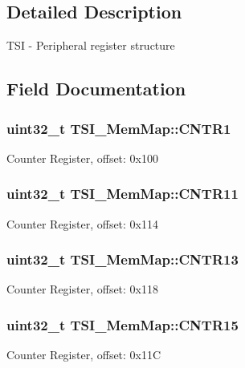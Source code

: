 \subsection{Detailed Description}
T\+S\+I -\/ Peripheral register structure 

\subsection{Field Documentation}
\hypertarget{struct_t_s_i___mem_map_a04fc03ca20b588fb20be9eee512fbfeb}{}
\subsubsection[{C\+N\+T\+R1}]{\setlength{\rightskip}{0pt plus 5cm}uint32\+\_\+t T\+S\+I\+\_\+\+Mem\+Map\+::\+C\+N\+T\+R1}\label{struct_t_s_i___mem_map_a04fc03ca20b588fb20be9eee512fbfeb}
Counter Register, offset\+: 0x100 \hypertarget{struct_t_s_i___mem_map_a73d4134257f7351180c72870359b2bbf}{}
\subsubsection[{C\+N\+T\+R11}]{\setlength{\rightskip}{0pt plus 5cm}uint32\+\_\+t T\+S\+I\+\_\+\+Mem\+Map\+::\+C\+N\+T\+R11}\label{struct_t_s_i___mem_map_a73d4134257f7351180c72870359b2bbf}
Counter Register, offset\+: 0x114 \hypertarget{struct_t_s_i___mem_map_aa09add648d77175d86d87c2d3533af74}{}
\subsubsection[{C\+N\+T\+R13}]{\setlength{\rightskip}{0pt plus 5cm}uint32\+\_\+t T\+S\+I\+\_\+\+Mem\+Map\+::\+C\+N\+T\+R13}\label{struct_t_s_i___mem_map_aa09add648d77175d86d87c2d3533af74}
Counter Register, offset\+: 0x118 \hypertarget{struct_t_s_i___mem_map_aada5f006d1b63bfb573ec56cdf21e4bc}{}
\subsubsection[{C\+N\+T\+R15}]{\setlength{\rightskip}{0pt plus 5cm}uint32\+\_\+t T\+S\+I\+\_\+\+Mem\+Map\+::\+C\+N\+T\+R15}\label{struct_t_s_i___mem_map_aada5f006d1b63bfb573ec56cdf21e4bc}
Counter Register, offset\+: 0x11\+C \hypertarget{struct_t_s_i___mem_map_a6784d9dce99cc4d0e04e4e527513c525}{}
